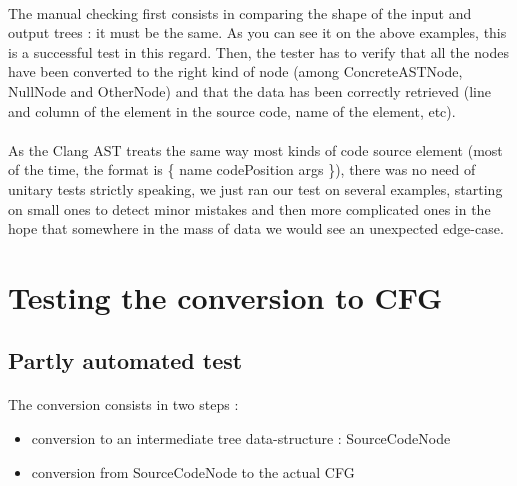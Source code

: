\documentclass{report}
\begin{document}
\paragraph{}
\hspace{4mm}The manual checking first consists in comparing the shape of the input and output trees : it must be the same. As you can see it on the above examples,
this is a successful test in this regard. Then, the tester has to verify that all the nodes have been converted to the right kind of node (among ConcreteASTNode,
NullNode and OtherNode) and that the data has been correctly retrieved (line and column of the element in the source code, name of the element, etc).

\paragraph{}
\hspace{4mm}As the Clang AST treats the same way most kinds of code source element (most of the time, the format is \{ name codePosition args \}), there was no need of unitary tests
strictly speaking, we just ran our test on several examples, starting on small ones to detect minor mistakes and then more complicated ones in the hope that somewhere
in the mass of data we would see an unexpected edge-case.

\section{Testing the conversion to CFG}

\subsection{Partly automated test}

\paragraph{}
\hspace{4mm}The conversion consists in two steps :

\vspace{1.5mm}
\begin{itemize}
\item conversion to an intermediate tree data-structure : SourceCodeNode\vspace{1mm}
\item conversion from SourceCodeNode to the actual CFG\vspace{1mm}
\end{itemize}
\end{document}

